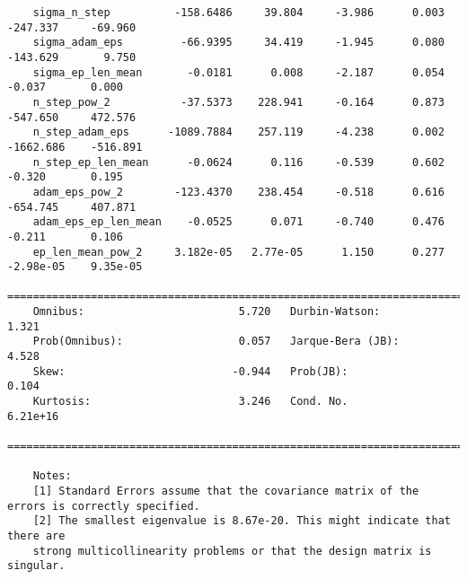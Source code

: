 \begin{verbatim}
    sigma_n_step          -158.6486     39.804     -3.986      0.003    -247.337     -69.960
    sigma_adam_eps         -66.9395     34.419     -1.945      0.080    -143.629       9.750
    sigma_ep_len_mean       -0.0181      0.008     -2.187      0.054      -0.037       0.000
    n_step_pow_2           -37.5373    228.941     -0.164      0.873    -547.650     472.576
    n_step_adam_eps      -1089.7884    257.119     -4.238      0.002   -1662.686    -516.891
    n_step_ep_len_mean      -0.0624      0.116     -0.539      0.602      -0.320       0.195
    adam_eps_pow_2        -123.4370    238.454     -0.518      0.616    -654.745     407.871
    adam_eps_ep_len_mean    -0.0525      0.071     -0.740      0.476      -0.211       0.106
    ep_len_mean_pow_2     3.182e-05   2.77e-05      1.150      0.277   -2.98e-05    9.35e-05
    ==============================================================================
    Omnibus:                        5.720   Durbin-Watson:                   1.321
    Prob(Omnibus):                  0.057   Jarque-Bera (JB):                4.528
    Skew:                          -0.944   Prob(JB):                        0.104
    Kurtosis:                       3.246   Cond. No.                     6.21e+16
    ==============================================================================

    Notes:
    [1] Standard Errors assume that the covariance matrix of the errors is correctly specified.
    [2] The smallest eigenvalue is 8.67e-20. This might indicate that there are
    strong multicollinearity problems or that the design matrix is singular.
\end{verbatim}

\clearpage
